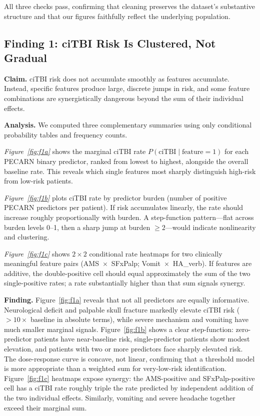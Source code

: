 \documentclass[10pt,letterpaper]{article}
\begin{document}
All three checks pass, confirming that cleaning preserves the dataset's substantive structure
and that our figures faithfully reflect the underlying population.

\subsection{Finding 1: ciTBI Risk Is Clustered, Not Gradual}
\label{finding1}

\textbf{Claim.}  ciTBI risk does not accumulate smoothly as features accumulate.
Instead, specific features produce large, discrete jumps in risk, and some feature combinations
are synergistically dangerous beyond the sum of their individual effects.

\textbf{Analysis.}  We computed three complementary summaries using only conditional probability
tables and frequency counts.

\emph{Figure~\ref{fig:f1a}} shows the marginal ciTBI rate $P(\text{ciTBI} \mid \text{feature} = 1)$ for each
PECARN binary predictor, ranked from lowest to highest, alongside the overall baseline rate.
This reveals which single features most sharply distinguish high-risk from low-risk patients.

\emph{Figure~\ref{fig:f1b}} plots ciTBI rate by predictor burden (number of positive PECARN predictors per
patient).
If risk accumulates linearly, the rate should increase roughly proportionally with burden.
A step-function pattern---flat across burden levels 0--1, then a sharp jump at burden $\ge 2$---would
indicate nonlinearity and clustering.

\emph{Figure~\ref{fig:f1c}} shows $2\times 2$ conditional rate heatmaps for two clinically meaningful feature
pairs (AMS~$\times$~SFxPalp; Vomit~$\times$~HA\_verb).
If features are additive, the double-positive cell should equal approximately the sum of the two
single-positive rates; a rate substantially higher than that sum signals synergy.

\textbf{Finding.}  Figure~\ref{fig:f1a} reveals that not all predictors are equally informative.
Neurological deficit and palpable skull fracture markedly elevate ciTBI risk ($>10\times$ baseline
in absolute terms), while severe mechanism and vomiting have much smaller marginal signals.
Figure~\ref{fig:f1b} shows a clear step-function: zero-predictor patients have near-baseline risk,
single-predictor patients show modest elevation, and patients with two or more predictors face
sharply elevated risk.
The dose-response curve is concave, not linear, confirming that a threshold model is more
appropriate than a weighted sum for very-low-risk identification.
Figure~\ref{fig:f1c} heatmaps expose synergy: the AMS-positive and SFxPalp-positive cell has a ciTBI rate
roughly triple the rate predicted by independent addition of the two individual effects.
Similarly, vomiting and severe headache together exceed their marginal sum.
\end{document}
